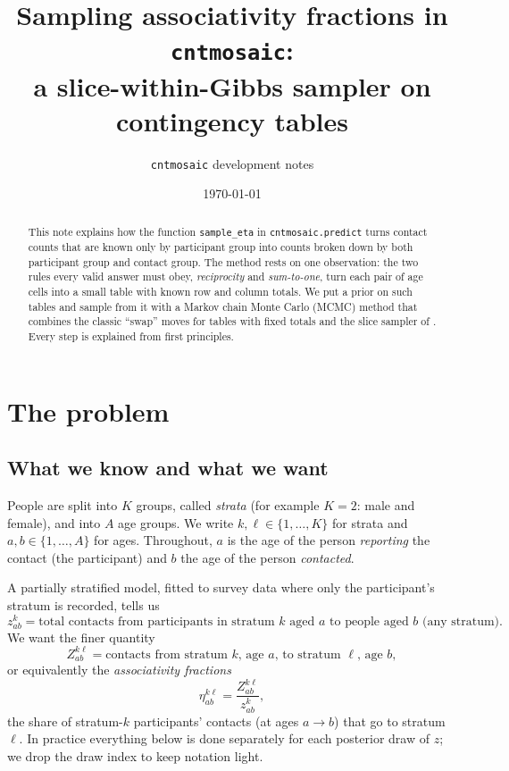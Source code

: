 \documentclass[11pt,a4paper]{article}
\title{Sampling associativity fractions in \texttt{cntmosaic}:\\
a slice-within-Gibbs sampler on contingency tables}
\author{\texttt{cntmosaic} development notes}
\date{\today}
\theoremstyle{definition}
\theoremstyle{remark}
\begin{document}
\maketitle

\begin{abstract}
\noindent
This note explains how the function \texttt{sample\_eta} in \texttt{cntmosaic.predict} turns contact
counts that are known only by participant group into counts broken down by
both participant group and contact group. The method rests on one observation:
the two rules every valid answer must obey, \emph{reciprocity} and
\emph{sum-to-one}, turn each pair of age cells into a small table with known
row and column totals. We put a prior on such tables and sample from it with
a Markov chain Monte Carlo (MCMC) method that combines the classic
``swap'' moves for tables with fixed totals and the slice sampler of
\citet{neal2003slice}. Every step is explained from first principles.
\end{abstract}

\tableofcontents

\section{The problem}
\label{sec:problem}

\subsection{What we know and what we want}

People are split into $K$ groups, called \emph{strata} (for example
$K=2$: male and female), and into $A$ age groups. We write
$k,\ell \in \{1,\dots,K\}$ for strata and $a,b \in \{1,\dots,A\}$ for ages.
Throughout, $a$ is the age of the person \emph{reporting} the contact (the
participant) and $b$ the age of the person \emph{contacted}.

A partially stratified model, fitted to survey data where only the
participant's stratum is recorded, tells us
\begin{equation}
  z^{k}_{ab} = \text{total contacts from participants in stratum } k
  \text{ aged } a \text{ to people aged } b \text{ (any stratum)}.
\end{equation}
We want the finer quantity
\begin{equation}
  Z^{k\ell}_{ab} = \text{contacts from stratum } k \text{, age } a
  \text{, to stratum } \ell \text{, age } b,
\end{equation}
or equivalently the \emph{associativity fractions}
\begin{equation}
  \eta^{k\ell}_{ab} = \frac{Z^{k\ell}_{ab}}{z^{k}_{ab}},
\end{equation}
the share of stratum-$k$ participants' contacts (at ages $a \to b$) that go
to stratum $\ell$. In practice everything below is done separately for
each posterior draw of $z$; we drop the draw index to keep notation light.
\end{document}
